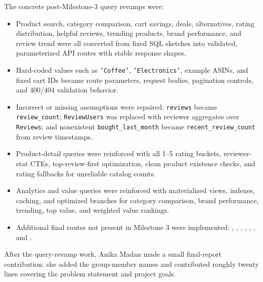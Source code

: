 \documentclass[10pt]{article}
\begin{document}
The concrete post-Milestone-3 query revamps were:
\begin{itemize}
  \item Product search, category comparison, cart savings, deals, alternatives,
  rating distribution, helpful reviews, trending products, brand performance,
  and review trend were all converted from fixed SQL sketches into validated,
  parameterized API routes with stable response shapes.
  \item Hard-coded values such as \texttt{'Coffee'}, \texttt{'Electronics'},
  example ASINs, and fixed cart IDs became route parameters, request bodies,
  pagination controls, and 400/404 validation behavior.
  \item Incorrect or missing assumptions were repaired: \texttt{reviews} became
  \texttt{review\_count}; \texttt{ReviewUsers} was replaced with reviewer
  aggregates over \texttt{Reviews}; and nonexistent
  \texttt{bought\_last\_month} became \texttt{recent\_review\_count} from
  review timestamps.
  \item Product-detail queries were reinforced with all 1--5 rating buckets,
  reviewer-stat CTEs, top-review-first optimization, clean product existence
  checks, and rating fallbacks for unreliable catalog counts.
  \item Analytics and value queries were reinforced with materialized views,
  indexes, caching, and optimized branches for category comparison, brand
  performance, trending, top value, and weighted value rankings.
  \item Additional final routes not present in Milestone 3 were implemented:
  , , ,
  , ,
  , and .
\end{itemize}

After the query-revamp work, Anika Madan made a small final-report contribution:
she added the group-member names and contributed roughly twenty lines covering
the problem statement and project goals.
\end{document}
